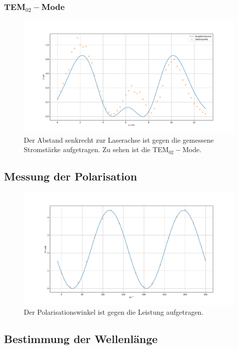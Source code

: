 \subsubsection{TEM$_{02}-$Mode}



\begin{figure}
    \centering
    \includegraphics[width=15cm]{plots/mode2.pdf}
    \caption{Der Abstand senkrecht zur Laserachse ist gegen die gemessene Stromstärke aufgetragen. Zu sehen ist die TEM$_{02}-$Mode.}
    \label{fig:mode2}
\end{figure}

\subsection{Messung der Polarisation}



\begin{figure}
    \centering
    \includegraphics[width=15cm]{plots/polarisation.pdf}
    \caption{Der Polarisationswinkel ist gegen die Leistung aufgetragen.}
    \label{fig:polarisation}
\end{figure}    

\subsection{Bestimmung der Wellenlänge}